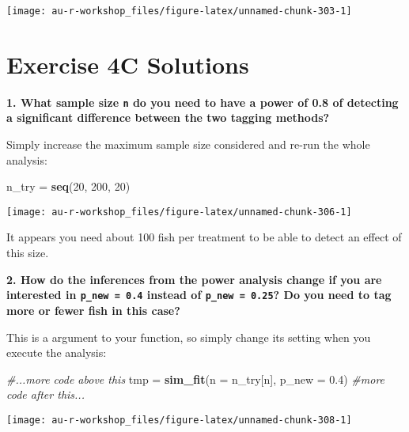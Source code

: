 \documentclass[]{book}
\newenvironment{Shaded}{\begin{snugshade}}{\end{snugshade}}
\newcommand{\KeywordTok}[1]{\textcolor[rgb]{0.13,0.29,0.53}{\textbf{#1}}}
\newcommand{\DataTypeTok}[1]{\textcolor[rgb]{0.13,0.29,0.53}{#1}}
\newcommand{\DecValTok}[1]{\textcolor[rgb]{0.00,0.00,0.81}{#1}}
\newcommand{\FloatTok}[1]{\textcolor[rgb]{0.00,0.00,0.81}{#1}}
\newcommand{\StringTok}[1]{\textcolor[rgb]{0.31,0.60,0.02}{#1}}
\newcommand{\CommentTok}[1]{\textcolor[rgb]{0.56,0.35,0.01}{\textit{#1}}}
\newcommand{\NormalTok}[1]{#1}
\theoremstyle{definition}
\theoremstyle{definition}
\theoremstyle{definition}
\theoremstyle{remark}
\begin{document}
\begin{center}\texttt{[image: au-r-workshop\_files/figure-latex/unnamed-chunk-303-1]} \end{center}

\hypertarget{ex4c-answers}{\section*{Exercise 4C
Solutions}\label{ex4c-answers}}

\textbf{1. What sample size \texttt{n} do you need to have a power of
0.8 of detecting a significant difference between the two tagging
methods?}

Simply increase the maximum sample size considered and re-run the whole
analysis:

\begin{Shaded}
\begin{Highlighting}[]
\NormalTok{n_try =}\StringTok{ }\KeywordTok{seq}\NormalTok{(}\DecValTok{20}\NormalTok{, }\DecValTok{200}\NormalTok{, }\DecValTok{20}\NormalTok{)}
\end{Highlighting}
\end{Shaded}

\begin{center}\texttt{[image: au-r-workshop\_files/figure-latex/unnamed-chunk-306-1]} \end{center}

It appears you need about 100 fish per treatment to be able to detect an
effect of this size.

\textbf{2. How do the inferences from the power analysis change if you
are interested in \texttt{p\_new\ =\ 0.4} instead of
\texttt{p\_new\ =\ 0.25}? Do you need to tag more or fewer fish in this
case?}

This is a argument to your function, so simply change its setting when
you execute the analysis:

\begin{Shaded}
\begin{Highlighting}[]
\CommentTok{#...more code above this}
\NormalTok{tmp =}\StringTok{ }\KeywordTok{sim_fit}\NormalTok{(}\DataTypeTok{n =}\NormalTok{ n_try[n], }\DataTypeTok{p_new =} \FloatTok{0.4}\NormalTok{)}
\CommentTok{#more code after this...}
\end{Highlighting}
\end{Shaded}

\begin{center}\texttt{[image: au-r-workshop\_files/figure-latex/unnamed-chunk-308-1]} \end{center}
\end{document}
